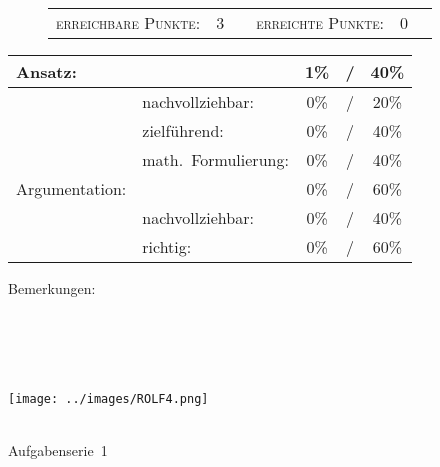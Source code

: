 \documentclass{article}
\begin{document}
\vspace{-0.5cm}
\begin{figure}[h!]
\begin{tabular}{crcrcr}
\textsc{erreichbare Punkte:} &3& & \textsc{erreichte Punkte:} &0
\end{tabular}
\end{figure}
\vspace{-0.1cm}
\begin{minipage}[t]{0.6\textwidth}
\flushleft
\begin{tabular}{l|lccc}
Ansatz:& &1\%&/&40\%\\\hline
&nachvollziehbar:&0\%&/&20\%\\
&zielf{\"u}hrend:&0\%&/&40\%\\
&math.~Formulierung:& 0\%&/&40\%\\\hline\hline
Argumentation:& &0\%&/&60\%\\\hline
&nachvollziehbar:&0\%&/&40\%\\
&richtig:&0\%&/&60\%\\\hline
\end{tabular}
\end{minipage}
\hfill
\begin{minipage}[t]{0.4\textwidth}
	\vspace{-1.75cm}
	Bemerkungen:\\\vspace*{0.2cm}
	\underline{\hspace{0.75\textwidth}}\\\vspace*{0.2cm}
	\underline{\hspace{0.75\textwidth}}
	\\\vspace*{0.2cm}
	\underline{\hspace{0.75\textwidth}}
	\\\vspace*{0.2cm}
	\underline{\hspace{0.75\textwidth}}
	\\\vspace*{0.2cm}
	\underline{\hspace{0.75\textwidth}}
\end{minipage}
	\vspace{0.5cm}\clearpage\vspace*{-2cm}
\parbox{4cm}{\texttt{[image: ../images/ROLF4.png]}}
\parbox{10.6cm}{ \\ Aufgabenserie~1  \\ \vspace*{-.5cm} }
\end{document}
